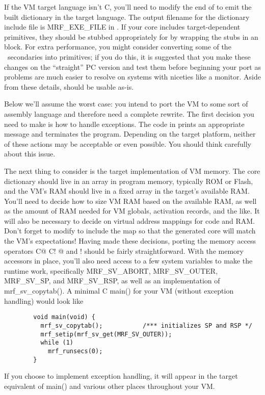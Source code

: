 \documentclass{article}
\begin{document}
If the VM target language isn't C, you'll need to modify the end of
 to emit the built dictionary in the target language. The
output filename for the dictionary include file is MRF\_EXE\_FILE in
. If your core includes target-dependent primitives,
they should be stubbed appropriately for  by wrapping
the stubs in an  block. For extra
performance, you might consider converting some of the \M\ secondaries
into primitives; if you do this, it is suggested that you make these
changes on the ``straight'' PC version and test them before beginning
your port as problems are much easier to resolve on systems with
niceties like a monitor. Aside from these details, 
should be usable as-is.

Below we'll assume the worst case: you intend to port the VM to some
sort of assembly language and therefore need a complete rewrite. The
first decision you need to make is how to handle exceptions. The code
in  prints an appropriate message and terminates the
program. Depending on the target platform, neither of these actions
may be acceptable or even possible. You should think carefully about
this issue.

The next thing to consider is the target implementation of VM
memory. The core dictionary should live in an array in program memory,
typically ROM or Flash, and the VM's RAM should live in a fixed array
in the target's available RAM. You'll need to decide how to size VM
RAM based on the available RAM, as well as the amount of RAM needed
for VM globals, activation records, and the like. It will also be
necessary to decide on virtual address mappings for code and
RAM. Don't forget to modify  to include the map so that
the generated core will match the VM's expectations! Having made these
decisions, porting the memory access operators C@ C! @ and ! should be
fairly straightforward. With the memory accessors in place, you'll
also need access to a few system variables to make the runtime work,
specifically MRF\_SV\_ABORT, MRF\_SV\_OUTER, MRF\_SV\_SP, and
MRF\_SV\_RSP, as well as an implementation of mrf\_sv\_copytab(). A
minimal C main() for your VM (without exception handling) would look
like
\begin{verbatim}
        void main(void) {
          mrf_sv_copytab();           /*** initializes SP and RSP */
          mrf_setip(mrf_sv_get(MRF_SV_OUTER));
          while (1)
            mrf_runsecs(0);
        }
\end{verbatim}
If you choose to implement exception handling, it will appear in the
target equivalent of main() and various other places throughout your
VM.
\end{document}
